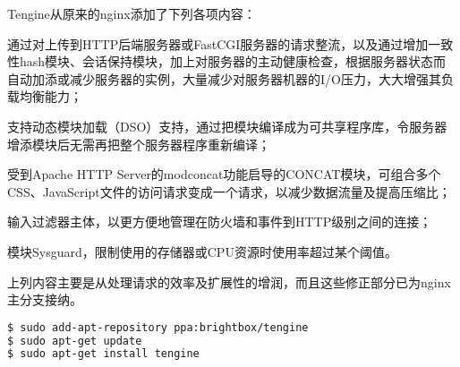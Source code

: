 Tengine从原来的nginx添加了下列各项内容：

\begin{compactitem}
\item 通过对上传到HTTP后端服务器或FastCGI服务器的请求整流，以及通过增加一致性hash模块、会话保持模块，加上对服务器的主动健康检查，根据服务器状态而自动加添或减少服务器的实例，大量减少对服务器机器的I/O压力，大大增强其负载均衡能力；

\item 支持动态模块加载（DSO）支持，通过把模块编译成为可共享程序库，令服务器增添模块后无需再把整个服务器程序重新编译；
\item 受到Apache HTTP Server的modconcat功能启导的CONCAT模块，可组合多个CSS、JavaScript文件的访问请求变成一个请求，以减少数据流量及提高压缩比；
\item 输入过滤器主体，以更方便地管理在防火墙和事件到HTTP级别之间的连接；
\item 模块Sysguard，限制使用的存储器或CPU资源时使用率超过某个阈值。

\end{compactitem}

上列内容主要是从处理请求的效率及扩展性的增润，而且这些修正部分已为nginx主分支接纳。

\begin{lstlisting}[language=bash]
$ sudo add-apt-repository ppa:brightbox/tengine
$ sudo apt-get update
$ sudo apt-get install tengine
\end{lstlisting}





